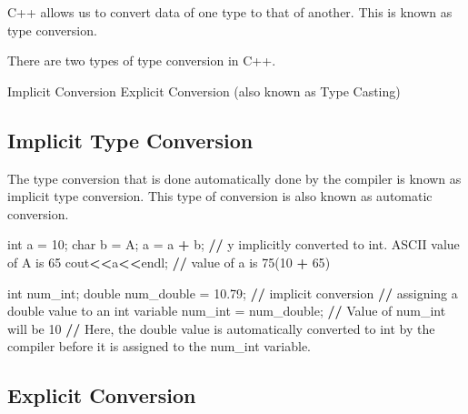 \documentclass[
]{article}
\newenvironment{Shaded}{\begin{snugshade}}{\end{snugshade}}
\newcommand{\DecValTok}[1]{\textcolor[rgb]{0.00,0.00,0.81}{#1}}
\newcommand{\ErrorTok}[1]{\textcolor[rgb]{0.64,0.00,0.00}{\textbf{#1}}}
\newcommand{\FloatTok}[1]{\textcolor[rgb]{0.00,0.00,0.81}{#1}}
\newcommand{\NormalTok}[1]{#1}
\newcommand{\OtherTok}[1]{\textcolor[rgb]{0.56,0.35,0.01}{#1}}
\newcommand{\SpecialCharTok}[1]{\textcolor[rgb]{0.81,0.36,0.00}{\textbf{#1}}}
\newcommand{\StringTok}[1]{\textcolor[rgb]{0.31,0.60,0.02}{#1}}
\begin{document}
C++ allows us to convert data of one type to that of another. This is
known as type conversion.

There are two types of type conversion in C++.

Implicit Conversion Explicit Conversion (also known as Type Casting)

\subsection{Implicit Type Conversion}\label{implicit-type-conversion}

The type conversion that is done automatically done by the compiler is
known as implicit type conversion. This type of conversion is also known
as automatic conversion.

\begin{Shaded}
\begin{Highlighting}[]
\NormalTok{int a }\OtherTok{=} \DecValTok{10}\NormalTok{;}
\NormalTok{char b }\OtherTok{=} \StringTok{\textquotesingle{}A\textquotesingle{}}\NormalTok{;}
\NormalTok{a }\OtherTok{=}\NormalTok{ a }\SpecialCharTok{+}\NormalTok{ b; }\SpecialCharTok{/}\ErrorTok{/}\NormalTok{ y implicitly converted to int. ASCII value of }\StringTok{\textquotesingle{}A\textquotesingle{}}\NormalTok{ is }\DecValTok{65}
\NormalTok{cout}\SpecialCharTok{\textless{}}\ErrorTok{\textless{}}\NormalTok{a}\SpecialCharTok{\textless{}}\ErrorTok{\textless{}}\NormalTok{endl;}
\SpecialCharTok{/}\ErrorTok{/}\NormalTok{ value of a is }\DecValTok{75}\NormalTok{(}\DecValTok{10} \SpecialCharTok{+} \DecValTok{65}\NormalTok{)}

\NormalTok{int num\_int;}
\NormalTok{double num\_double }\OtherTok{=} \FloatTok{10.79}\NormalTok{;  }
\SpecialCharTok{/}\ErrorTok{/}\NormalTok{ implicit conversion  }
\SpecialCharTok{/}\ErrorTok{/}\NormalTok{ assigning a double value to an int variable  }
\NormalTok{num\_int }\OtherTok{=}\NormalTok{ num\_double;  }
\SpecialCharTok{/}\ErrorTok{/}\NormalTok{ Value of num\_int will be }\DecValTok{10}
\SpecialCharTok{/}\ErrorTok{/}\NormalTok{ Here, the double value is automatically converted to int by the compiler before it is assigned to the num\_int variable.}
\end{Highlighting}
\end{Shaded}

\subsection{Explicit Conversion}\label{explicit-conversion}
\end{document}
